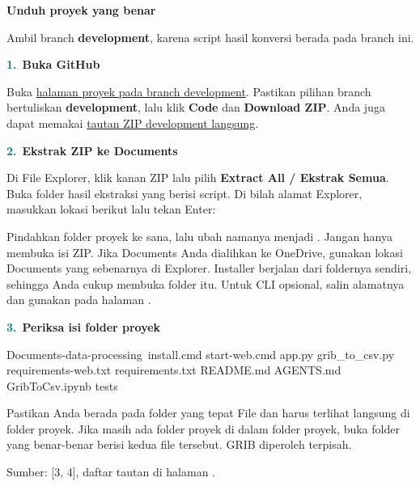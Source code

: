 \documentclass[11pt,a4paper]{article}
\newcommand{\step}[2]{\par\addvspace{2mm}\noindent\textcolor{teal}{\textbf{#1.}}\ \textbf{#2}\par\nobreak}
\newcommand{\pagetitle}[3]{\clearpage{\color{teal}\small\bfseries LANGKAH #1}\par{\color{slate}\LARGE\bfseries #2}\par\vspace{2mm}#3\par\vspace{3mm}}
\newcommand{\source}[1]{{\footnotesize\color{blue}Sumber: [#1], daftar tautan di halaman \pageref{pg:references}.}\par}
\begin{document}
\pagetitle{2}{Unduh proyek yang benar}{Ambil branch \textbf{development}, karena script hasil konversi berada pada branch ini.}
\label{pg:download}
\step{1}{Buka GitHub}
Buka \href{https://github.com/ropok/grib-data-processing/tree/development}{halaman proyek pada branch development}.
Pastikan pilihan branch bertuliskan \textbf{development}, lalu klik
\textbf{Code} dan \textbf{Download ZIP}. Anda juga dapat memakai
\href{https://github.com/ropok/grib-data-processing/archive/refs/heads/development.zip}{tautan ZIP development langsung}.
\par\noindent{}\par
\step{2}{Ekstrak ZIP ke Documents}
Di File Explorer, klik kanan ZIP lalu pilih \textbf{Extract All / Ekstrak Semua}.
Buka folder hasil ekstraksi yang berisi script. Di bilah alamat Explorer,
masukkan lokasi berikut lalu tekan Enter:
\begin{terminal}
\end{terminal}
Pindahkan folder proyek ke sana, lalu ubah namanya menjadi
. Jangan hanya membuka isi ZIP.
Jika Documents Anda dialihkan ke OneDrive, gunakan lokasi Documents yang
sebenarnya di Explorer. Installer berjalan dari foldernya sendiri, sehingga
Anda cukup membuka folder itu. Untuk CLI opsional, salin alamatnya dan gunakan
 pada halaman \pageref{pg:powershell}.
\step{3}{Periksa isi folder proyek}
\begin{terminal}
Documents\grib-data-processing\
  install.cmd
  start-web.cmd
  app.py
  grib_to_csv.py
  requirements-web.txt
  requirements.txt
  README.md
  AGENTS.md
  GribToCsv.ipynb
  tests\
\end{terminal}
\begin{panel}{Pastikan Anda berada pada folder yang tepat}
File  dan  harus terlihat langsung
di folder proyek. Jika masih ada folder proyek di dalam folder proyek, buka
folder yang benar-benar berisi kedua file tersebut. GRIB diperoleh terpisah.
\end{panel}
\source{3, 4}
\end{document}
